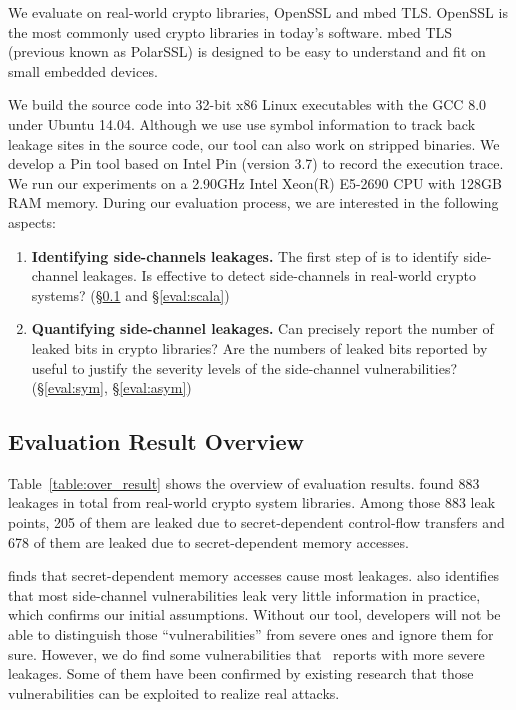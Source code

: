 We evaluate \tool{} on real-world crypto libraries, OpenSSL and mbed TLS\@. OpenSSL
is the most commonly used crypto libraries in today's software. mbed TLS\@
(previous known as PolarSSL) is designed to be easy to understand and fit on
small embedded devices.

We build the source code into 32-bit x86 Linux executables with the GCC 8.0
under Ubuntu 14.04. Although we use use symbol information to track back leakage
sites in the source code, our tool can also work on stripped binaries. We
develop a Pin tool based on Intel Pin (version 3.7) to record the execution
trace. We run our experiments on a 2.90GHz Intel Xeon(R) E5-2690 CPU with 128GB
RAM memory. During our evaluation process, we are interested in the following
aspects:
\begin{enumerate}
    \item  \textbf{Identifying side-channels leakages.}
          The first step of \tool{} is to identify side-channel leakages. Is
          \tool{} effective to detect side-channels in real-world crypto
          systems? (\S\ref{sec:eval_overview} and \S\ref{eval:scala})
    \item  \textbf{Quantifying side-channel leakages.}
          Can \tool{} precisely report the number of leaked bits in crypto
          libraries? Are the numbers of leaked bits reported by \tool{} useful
          to justify the severity levels of the side-channel vulnerabilities?
          (\S\ref{eval:sym}, \S\ref{eval:asym})
\end{enumerate}

\subsection{Evaluation Result Overview} \label{sec:eval_overview}
Table~\ref{table:over_result} shows the overview of evaluation results. \tool{} found
883 leakages in total from real-world crypto system libraries. Among those 883
leak points, 205 of them are leaked due to secret-dependent control-flow
transfers and 678 of them are leaked due to secret-dependent memory accesses.

\tool{} finds that secret-dependent memory accesses
cause most leakages. \tool{} also identifies that most side-channel
vulnerabilities leak very little information in practice, which confirms our
initial assumptions.  Without our tool, developers will not be able to
distinguish those ``vulnerabilities'' from severe ones and ignore them for sure.
However, we do find some vulnerabilities that \tool\ reports with more severe
leakages. Some of them have been confirmed by existing research that those
vulnerabilities can be exploited to realize real attacks.

